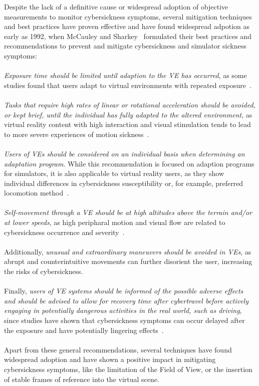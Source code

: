 Despite the lack of a definitive cause or widespread adoption of objective measurements to monitor cybersickness
symptoms, several mitigation techniques and best practices have proven effective and have found widespread adpotion
as early as 1992, when McCauley and Sharkey~\cite{McCauley1992} formulated their best practices and recommendations
to prevent and mitigate cybersickness and simulator sickness symptoms:
\\
\\
\textit{Exposure time should be limited until adaption to the VE has occurred}, as some studies found that users
adapt to virtual environments with repeated exposure~\cite{Hill2000}.
\\
\\
\textit{Tasks that require high rates of linear or rotational acceleration should be avoided, or kept brief, until the
individual has fully adapted to the altered environment}, as virtual reality content with high interaction and visual
stimulation tends to lead to more severe experiences of motion sickness~\cite{Saredakis2020}.
\\
\\
\textit{Users of VEs should be considered on an individual basis when determining an adaptation program}.
While this recommendation is focused on adaption programs for simulators, it is also applicable to virtual reality
users, as they show individual differences in cybersickness susceptibility or, for example, preferred locomotion 
method~\cite{Clifton2020}.
\\
\\
\textit{Self-movement through a VE should be at high altitudes above the terrain and/or at lower speeds}, as high
peripharal motion and visual flow are related to cybersickness occurrence and severity~\cite{Buhler2018}.
\\
\\
Additionally, \textit{unusual and extraordinary maneuvers should be avoided in VEs}, as abrupt and counterintuitive
movements can further disorient the user, increasing the risks of cybersickness.
\\
\\
Finally, \textit{users of VE systems should be informed of the possible adverse effects and should be advised to
allow for recovery time after cybertravel before actively engaging in potentially dangerous activities in the real
world, such as driving}, since studies have shown that cybersickness symptoms can occur delayed after the exposure
and have potentially lingering effects~\cite{LaViola2000}.
\\
\\
Apart from these general recommendations, several techniques have found widespread adoption and have shown a positive
impact in mitigating cybersickness symptoms, like the limitation of the Field of View, or the insertion of stable
frames of reference into the virtual scene.


